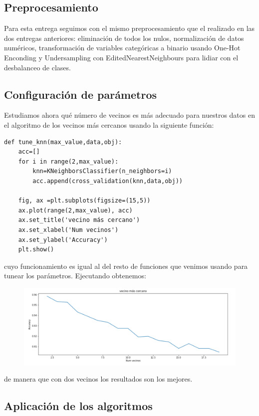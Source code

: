 \documentclass[a4paper,11pt]{article}
\begin{document}
\subsection{Preprocesamiento}
Para esta entrega seguimos con el mismo preprocesamiento que el realizado en las dos entregas anteriores: eliminación de todos los nulos, normalización de datos numéricos,  transformación de variables categóricas a binario usando One-Hot Enconding y Undersampling con EditedNearestNeighbours para lidiar con el desbalanceo de clases. 
\subsection{Configuración de parámetros}
Estudiamos ahora qué número de vecinos es más adecuado para nuestros datos en el algoritmo de los vecinos más cercanos usando la siguiente función:
\begin{verbatim}
def tune_knn(max_value,data,obj):
	acc=[]
	for i in range(2,max_value):
		knn=KNeighborsClassifier(n_neighbors=i)
		acc.append(cross_validation(knn,data,obj))
	
	fig, ax =plt.subplots(figsize=(15,5))
	ax.plot(range(2,max_value), acc)
	ax.set_title('vecino más cercano')
	ax.set_xlabel('Num vecinos')
	ax.set_ylabel('Accuracy')
	plt.show()

\end{verbatim}
cuyo funcionamiento es igual al del resto de funciones que venimos usando para tunear los parámetros. Ejecutando  obtenemos:
\begin{figure}[H]
	\centering
	\includegraphics[width=0.9\linewidth]{img/knn3}
	\caption{}
	\label{fig:knn3}
\end{figure}


de manera que con dos vecinos los resultados son los mejores. 

\subsection{Aplicación de los algoritmos}
\end{document}
